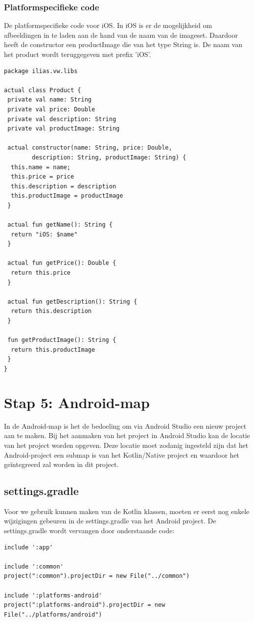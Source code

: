 \subsubsection{Platformspecifieke code}
De platformspecifieke code voor iOS. In iOS is er de mogelijkheid om afbeeldingen in te laden aan de hand van de naam van de imageset. Daardoor heeft de constructor een productImage die van het type String is. De naam van het product wordt teruggegeven met prefix 'iOS'.
\begin{lstlisting}
package ilias.vw.libs

actual class Product {
 private val name: String
 private val price: Double
 private val description: String
 private val productImage: String

 actual constructor(name: String, price: Double, 
		description: String, productImage: String) {
  this.name = name;
  this.price = price
  this.description = description
  this.productImage = productImage
 }

 actual fun getName(): String {
  return "iOS: $name"
 }

 actual fun getPrice(): Double {
  return this.price
 }

 actual fun getDescription(): String {
  return this.description
 }

 fun getProductImage(): String {
  return this.productImage
 }
}
\end{lstlisting}

\section{Stap 5: Android-map}
In de Android-map is het de bedoeling om via Android Studio een nieuw project aan te maken. Bij het aanmaken van het project in Android Studio kan de locatie van het project worden opgeven. Deze locatie moet zodanig ingesteld zijn dat het Android-project een submap is van het Kotlin/Native project en waardoor het geïntegreerd zal worden in dit project.

\subsection{settings.gradle}
Voor we gebruik kunnen maken van de Kotlin klassen, moeten er eerst nog enkele wijzigingen gebeuren in de settings.gradle van het Android project. De settings.gradle wordt vervangen door onderstaande code:

\begin{lstlisting}
include ':app'

include ':common'
project(":common").projectDir = new File("../common")

include ':platforms-android'
project(":platforms-android").projectDir = new File("../platforms/android")
\end{lstlisting}

